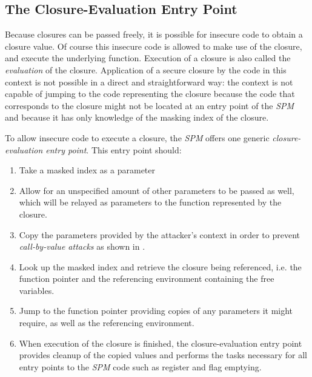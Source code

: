 \subsection{The Closure-Evaluation Entry Point}

Because closures can be passed freely, it is possible for insecure code to obtain a closure value.
Of course this insecure code is allowed to make use of the closure, and execute the underlying function.
Execution of a closure is also called the \emph{evaluation} of the closure.
Application of a secure closure by the code in this context is not possible in a direct and straightforward way: the context is not capable of jumping to the code representing the closure because the code that corresponds to the closure might not be located at an entry point of the \emph{SPM} and because it has only knowledge of the masking index of the closure.

To allow insecure code to execute a closure, the \emph{SPM} offers one generic \emph{closure-evaluation entry point}. This entry point should:

\begin{enumerate}
\item Take a masked index as a parameter
\item Allow for an unspecified amount of other parameters to be passed as well, which will be relayed as parameters to the function represented by the closure.
\item Copy the parameters provided by the attacker's context in order to prevent \emph{call-by-value attacks} as shown in .
\item Look up the masked index and retrieve the closure being referenced, i.e. the function pointer and the referencing environment containing the free variables.
\item Jump to the function pointer providing copies of any parameters it might require, as well as the referencing environment.
\item When execution of the closure is finished, the closure-evaluation entry point provides cleanup of the copied values and performs the tasks necessary for all entry points to the \emph{SPM} code such as register and flag emptying.
\end{enumerate}
%
%

